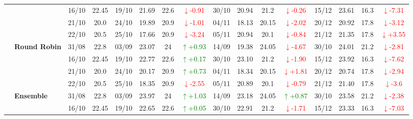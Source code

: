 \documentclass{ieeeaccess}
\begin{document}
{\begin{longtable}{llcc|cccc|cccc|cccc}
& 
& 16/10 & 22.45 & 19/10 & 21.69 & 22.6 & \textcolor{red}{\(\downarrow\)-0.91} & 30/10 & 20.94 & 21.2 & \textcolor{red}{\(\downarrow\)-0.26} & 15/12 & 23.61 & 16.3 & \textcolor{red}{\(\downarrow\)-7.31} \\

& 
& 21/10 & 20.0 & 24/10 & 19.89 & 20.9 & \textcolor{red}{\(\downarrow\)-1.01} & 04/11 & 18.13 & 20.15 & \textcolor{red}{\(\downarrow\)-2.02} & 20/12 & 20.92 & 17.8 & \textcolor{red}{\(\downarrow\)-3.12} \\

&
& 22/10 & 20.5 & 25/10 & 17.66 & 20.9 & \textcolor{red}{\(\downarrow\)-3.24} & 05/11 & 20.94 & 20.1 & \textcolor{red}{\(\downarrow\)-0.84} & 21/12 & 21.35 & 17.8 & \textcolor{red}{\(\downarrow\)+3.55} \\
\cmidrule(lr){2-16}


& \textbf{Round Robin}
& 31/08 & 22.8 & 03/09 & 23.07 & 24 & \textcolor{green}{\(\uparrow\)+0.93} & 14/09 & 19.38 & 24.05 & \textcolor{red}{\(\downarrow\)-4.67} & 30/10 & 24.01 & 21.2 & \textcolor{red}{\(\downarrow\)-2.81} \\

&
& 16/10 & 22.45 & 19/10 & 22.77 & 22.6 & \textcolor{green}{\(\uparrow\)+0.17} & 30/10 & 23.10 & 21.2 & \textcolor{red}{\(\downarrow\)-1.90} & 15/12 & 23.92 & 16.3 & \textcolor{red}{\(\downarrow\)-7.62} \\

&
& 21/10 & 20.0 & 24/10 & 20.17 & 20.9 & \textcolor{green}{\(\uparrow\)+0.73} & 04/11 & 18.34 & 20.15 & \textcolor{red}{\(\downarrow\)+1.81} & 20/12 & 20.74 & 17.8 & \textcolor{red}{\(\downarrow\)-2.94} \\

&
& 22/10 & 20.5 & 25/10 & 18.35 & 20.9 & \textcolor{red}{\(\downarrow\)-2.55} & 05/11 & 20.89 & 20.1 & \textcolor{red}{\(\downarrow\)-0.79} & 21/12 & 21.40 & 17.8 & \textcolor{red}{\(\downarrow\)-3.6} \\
\cmidrule(lr){2-16}


& \textbf{Ensemble}
& 31/08 & 22.8 & 03/09 & 23.97 & 24 & \textcolor{green}{\(\uparrow\)+1.03} & 14/09 & 23.18 & 24.05 & \textcolor{green}{\(\uparrow\)+0.87} & 30/10 & 23.58 & 21.2 & \textcolor{red}{\(\downarrow\)-2.38} \\

&
& 16/10 & 22.45 & 19/10 & 22.65 & 22.6 & \textcolor{green}{\(\uparrow\)+0.05} & 30/10 & 22.91 & 21.2 & \textcolor{red}{\(\downarrow\)-1.71} & 15/12 & 23.33 & 16.3 & \textcolor{red}{\(\downarrow\)-7.03} \\


\end{longtable}}
\end{document}
